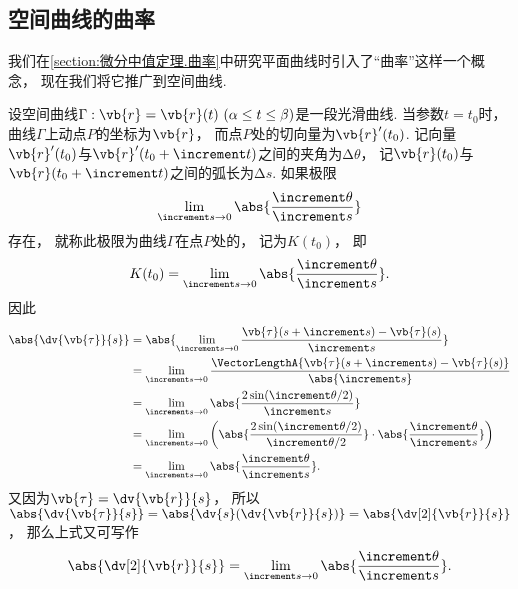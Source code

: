 \subsection{空间曲线的曲率}
我们在\cref{section:微分中值定理.曲率}中研究平面曲线时引入了“曲率”这样一个概念，
现在我们将它推广到空间曲线.

设空间曲线\(\Gamma: \vb{r} = \vb{r}(t)\ (\alpha \leq t \leq \beta)\)是一段光滑曲线.
当参数\(t = t_0\)时，曲线\(\Gamma\)上动点\(P\)的坐标为\(\vb{r}\)，
而点\(P\)处的切向量为\(\vb{r}'(t_0)\).
记向量\(\vb{r}'(t_0)\)与\(\vb{r}'(t_0+\increment t)\)之间的夹角为\(\increment\theta\)，
记\(\vb{r}(t_0)\)与\(\vb{r}(t_0+\increment t)\)之间的弧长为\(\increment s\).
如果极限\begin{equation*}
	\lim_{\increment s \to 0} \abs{ \frac{\increment\theta}{\increment s} }
\end{equation*}存在，
就称此极限为曲线\(\Gamma\)在点\(P\)处的，
记为\(K(t_0)\)，
即\begin{equation*}
	K(t_0)
	= \lim_{\increment s \to 0} \abs{ \frac{\increment\theta}{\increment s} }.
\end{equation*}
因此\begin{align*}
	\abs{ \dv{\vb{\tau}}{s} }
	&= \abs{
			\lim_{\increment s \to 0}
				\frac{\vb{\tau}(s+\increment s) - \vb{\tau}(s)}{\increment s}
		} \\
	&= \lim_{\increment s \to 0}
		\frac{\VectorLengthA{\vb{\tau}(s+\increment s) - \vb{\tau}(s)}}{\abs{\increment s}} \\
	&= \lim_{\increment s \to 0}
		\abs{ \frac{2 \sin(\increment\theta / 2)}{\increment s} } \\
	&= \lim_{\increment s \to 0}
		\left(
			\abs{ \frac{2 \sin(\increment\theta / 2)}{\increment\theta/2} }
			\cdot \abs{ \frac{\increment\theta}{\increment s} }
		\right) \\
	&= \lim_{\increment s \to 0}
		\abs{ \frac{\increment\theta}{\increment s} }.
\end{align*}
又因为\(\vb{\tau} = \dv{\vb{r}}{s}\)，
所以\(\abs{ \dv{\vb{\tau}}{s} }
= \abs{ \dv{s}( \dv{\vb{r}}{s} ) }
= \abs{ \dv[2]{\vb{r}}{s} }\)，
那么上式又可写作\begin{equation}
	\abs{ \dv[2]{\vb{r}}{s} }
	= \lim_{\increment s \to 0} \abs{ \frac{\increment\theta}{\increment s} }.
\end{equation}

